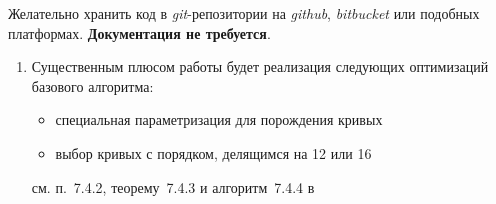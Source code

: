 \documentclass{ca-capstone}
\begin{document}
Желательно хранить код в \emph{git}-репозитории на \emph{github}, \emph{bitbucket} или подобных
платформах. \textbf{Документация не требуется}.

\remarks
\begin{enumerate}
  \item Существенным плюсом работы будет реализация следующих оптимизаций базового алгоритма:
    \begin{itemize}
      \item специальная параметризация для порождения кривых
      \item выбор кривых с порядком, делящимся на 12 или 16
    \end{itemize}
    см. п.~7.4.2, теорему~7.4.3 и алгоритм~7.4.4 в~\cite{crandall-pomerance}
\end{enumerate}

\end{document}

